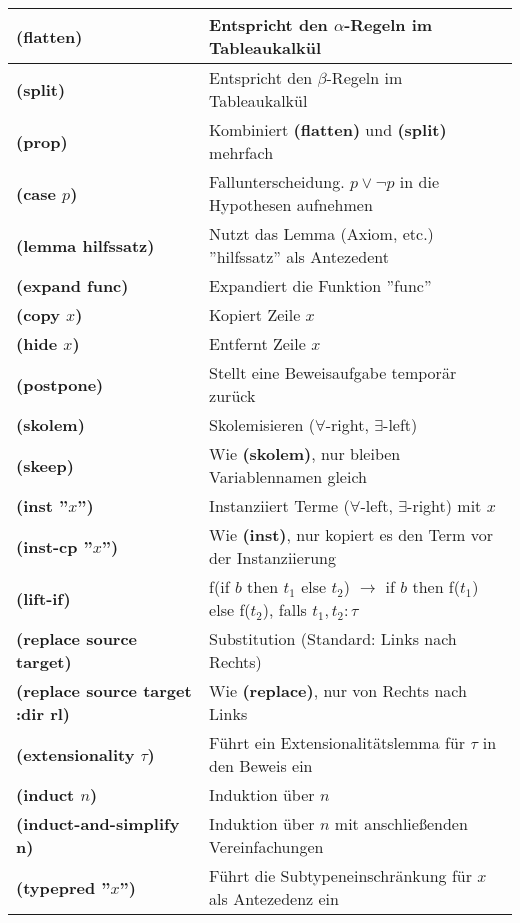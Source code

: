 \documentclass{scrartcl}
\begin{document}
\renewcommand{\arraystretch}{2}
\begin{tabular}{l|l}
	\textbf{(flatten)} & Entspricht den $ \alpha $-Regeln im Tableaukalkül \\
	\hline
	\textbf{(split)} & Entspricht den $ \beta $-Regeln im Tableaukalkül \\
	\hline
	\textbf{(prop)} & Kombiniert \textbf{(flatten)} und \textbf{(split)} mehrfach \\
	\hline
	\textbf{(case $ p $)} & Fallunterscheidung. $ p \vee \neg p $ in die Hypothesen aufnehmen \\
	\hline
	\textbf{(lemma hilfssatz)} & Nutzt das Lemma (Axiom, etc.) ''hilfssatz'' als Antezedent \\
	\hline
	\textbf{(expand func)} & Expandiert die Funktion ''func'' \\
	\hline
	\textbf{(copy $ x $)} & Kopiert Zeile $ x $ \\
	\hline
	\textbf{(hide $ x $)} & Entfernt Zeile $ x $ \\
	\hline
	\textbf{(postpone)} & Stellt eine Beweisaufgabe temporär zurück \\
	\hline
	\textbf{(skolem)} & Skolemisieren ($ \forall $-right, $ \exists $-left) \\
	\hline
	\textbf{(skeep)} & Wie \textbf{(skolem)}, nur bleiben Variablennamen gleich \\
	\hline
	\textbf{(inst ''$ x $'')} & Instanziiert Terme ($ \forall $-left, $ \exists $-right) mit $ x $ \\
	\hline
	\textbf{(inst-cp ''$ x $'')} & Wie \textbf{(inst)}, nur kopiert es den Term vor der Instanziierung \\
	\hline
	\textbf{(lift-if)} & f(if $ b $ then $ t_1 $ else $ t_2 $) $ \rightarrow $ if $ b $ then f($ t_1 $) else f($ t_2 $), falls $ t_1,t_2:\tau $ \\
	\hline
	\textbf{(replace source target)} & Substitution (Standard: Links nach Rechts) \\
	\hline
	\textbf{(replace source target :dir rl)} & Wie \textbf{(replace)}, nur von Rechts nach Links \\
	\hline
	\textbf{(extensionality $ \tau $)} & Führt ein Extensionalitätslemma für $ \tau $ in den Beweis ein \\
	\hline
	\textbf{(induct $ n $)} & Induktion über $ n $ \\
	\hline
	\textbf{(induct-and-simplify n)} & Induktion über $ n $ mit anschließenden Vereinfachungen \\
	\hline
	\textbf{(typepred ''$ x $'')} & Führt die Subtypeneinschränkung für $ x $ als Antezedenz ein
\end{tabular}
\end{document}
